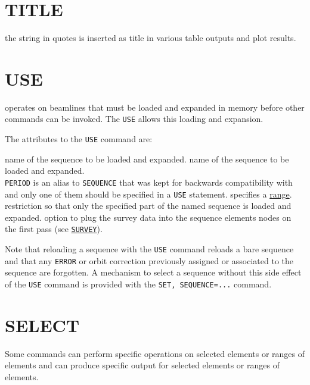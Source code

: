 \section{TITLE}
\label{sec:title}
the string in quotes is inserted as title in various table outputs and
plot results.  


\section{USE}
\label{sec:use}
\madx operates on beamlines that must be loaded and expanded in memory
before other commands can be invoked. The {\tt USE} allows this
loading and expansion.


The attributes to the {\tt USE} command are:
\begin{madlist}
   name of the sequence to be loaded and expanded. 
   name of the sequence to be loaded and expanded. \\ 
  {\tt PERIOD} is an alias to {\tt SEQUENCE} that was kept for
  backwards compatibility with \madeight and only one of them should be
  specified in a {\tt USE} statement. 
   specifies a \hyperref[sec:range]{range}.   
  restriction so that only the specified part of the named sequence is
  loaded and  expanded.
   option to plug the survey data into the sequence elements
  nodes on the first pass (see \hyperref[chap:survey]{\tt SURVEY}).
\end{madlist}

Note that reloading a sequence with the {\tt USE} command reloads a
bare sequence and that any {\tt ERROR} or orbit correction previously
assigned or associated to the sequence are forgotten. 
A mechanism to select a sequence without this side effect of the
{\tt USE} command is provided with the {\tt SET, SEQUENCE=...} command.


\section{SELECT} 
\label{sec:select}

Some \madx commands can perform specific operations on selected elements
or ranges of elements and can produce specific output for selected
elements or ranges of elements. 

